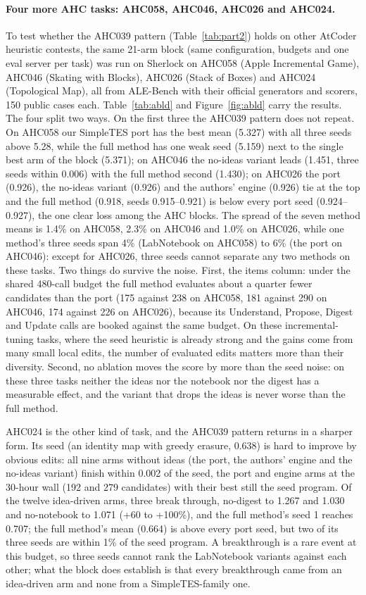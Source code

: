 \paragraph{Four more AHC tasks: AHC058, AHC046, AHC026 and AHC024.} To test whether the AHC039
pattern (Table~\ref{tab:part2}) holds on other AtCoder heuristic contests, the same 21-arm block
(same configuration, budgets and one eval server per task) was run on Sherlock on AHC058 (Apple
Incremental Game), AHC046 (Skating with Blocks), AHC026 (Stack of Boxes) and AHC024 (Topological
Map), all from ALE-Bench with their official generators and scorers, 150 public cases each.
Table~\ref{tab:abld} and Figure~\ref{fig:abld} carry the results. The four split two ways. On the
first three the AHC039 pattern does not repeat. On
AHC058 our SimpleTES port has the best mean (5.327) with all three seeds above 5.28, while the full
method has one weak seed (5.159) next to the single best arm of the block (5.371); on AHC046 the
no-ideas variant leads (1.451, three seeds within 0.006) with the full method second (1.430); on
AHC026 the port (0.926), the no-ideas variant (0.926) and the authors' engine (0.926) tie at the top
and the full method (0.918, seeds 0.915--0.921) is below every port seed (0.924--0.927), the one
clear loss among the AHC blocks. The spread of the seven method means is 1.4\% on AHC058, 2.3\% on
AHC046 and 1.0\% on AHC026, while one method's three seeds span 4\% (LabNotebook on AHC058) to 6\%
(the port on AHC046): except for AHC026, three seeds cannot separate any two methods on these tasks.
Two things do survive the noise. First, the items column: under the shared 480-call budget the full
method evaluates about a quarter fewer candidates than the port (175 against 238 on AHC058, 181
against 290 on AHC046, 174 against 226 on AHC026), because its Understand, Propose, Digest and
Update calls are booked against the same budget. On these incremental-tuning tasks, where the seed
heuristic is already strong and the gains come from many small local edits, the number of
evaluated edits matters more than their diversity. Second, no ablation moves the score by more than
the seed noise: on these three tasks neither the ideas nor the notebook nor the digest has a
measurable effect, and the variant that drops the ideas is never worse than the full method.

AHC024 is the other kind of task, and the AHC039 pattern returns in a sharper form. Its seed (an
identity map with greedy erasure, 0.638) is hard to improve by obvious edits: all nine arms without
ideas (the port, the authors' engine and the no-ideas variant) finish within 0.002 of the seed, the
port and engine arms at the 30-hour wall (192 and 279 candidates) with their best still the seed
program. Of the twelve idea-driven arms, three break through, no-digest to 1.267 and 1.030 and
no-notebook to 1.071 (+60 to +100\%), and the full method's seed 1 reaches 0.707; the full method's
mean (0.664) is above every port seed, but two of its three seeds are within 1\% of the seed
program. A breakthrough is a rare event at this budget, so three seeds cannot rank the LabNotebook
variants against each other; what the block does establish is that every breakthrough came from an
idea-driven arm and none from a SimpleTES-family one.

